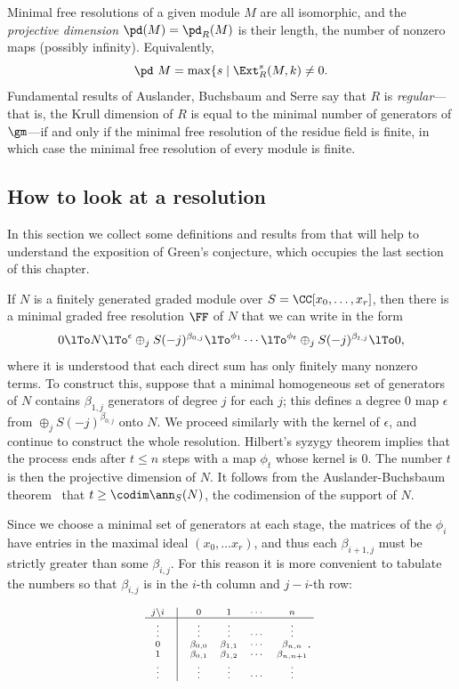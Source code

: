 Minimal free resolutions of a given module $M$ are all isomorphic, and the \emph{projective dimension}  $\pd(M) = \pd_R(M)$ is their length, the number of nonzero
maps (possibly infinity). Equivalently, 
$$
\pd\ M = \max\{s \mid \Ext_R^s(M,k) \neq 0.
$$
Fundamental
results of Auslander, Buchsbaum and Serre say that $R$ is \emph{regular}---that is, the Krull dimension of $R$ is equal to the minimal number
of generators of $\gm$---if and only if the minimal free resolution of the residue field is finite, in which case
the minimal free resolution of every module is finite. 


\subsection{How to look at a resolution}
In this section we collect some definitions and results from \cite{Eisenbud1995} that will help to understand the exposition of Green's conjecture, which occupies the last section of this chapter.

If $N$ is a finitely generated graded module over $S = \CC[x_0,\dots, x_r]$, then there is a minimal graded free resolution $\FF$
of $N$ that we can write in the form
$$
0\lTo N \lTo^\epsilon \oplus_jS(-j)^{\beta_{0,j}} \lTo^{\phi_1} \cdots \lTo^{\phi_t}\oplus_jS(-j)^{\beta_{t,j}}\lTo 0,
$$
where it is understood that each direct sum has only finitely many nonzero terms.
To construct this, suppose that a minimal homogeneous set of generators of $N$
contains $\beta_{1,j}$ generators of degree $j$ for each $j$; this defines a degree 0 map $\epsilon$
from 
$
\oplus_jS(-j)^{\beta_{0,j}}
$
onto $N$. We proceed similarly with the kernel of $\epsilon$, and continue to construct the whole resolution.
Hilbert's syzygy theorem \cite[***]{Eisenbud1995} implies that the process ends after $t\leq n$ steps with a map $\phi_t$ whose
kernel is 0. The number $t$ is then the projective dimension of $N$. It follows from the Auslander-Buchsbaum
theorem~\cite[***]{Eisenbud1995} that $t \geq \codim \ann_S(N)$, the codimension of the support of $N$.

Since we choose a minimal set of generators at each stage, the matrices of the $\phi_i$ have entries in the maximal
ideal $(x_0,\dots x_r)$, and thus each $\beta_{i+1, j}$ must be strictly greater than some $\beta_{i,j}$. For this reason it
is more convenient to tabulate the numbers so that $\beta_{i,j}$ is in the $i$-th column and $j-i$-th row:

$$
\scriptsize{
\begin{matrix} 
j\backslash i&\vline&0   &  1    & \cdots & n    \cr\hline
\vdots&\vline&\vdots&\vdots & \cdots    &\vdots     \cr 
       0&\vline&\beta_{0,0}&\beta_{1,1}&\cdots&\beta_{n,n}\cr
       1&\vline&\beta_{0,1}&\beta_{1,2}&\cdots&\beta_{n,n+1}\cr
\vdots&\vline&\vdots&\vdots & \cdots    &\vdots     \cr 
\end{matrix}.
}
$$         


